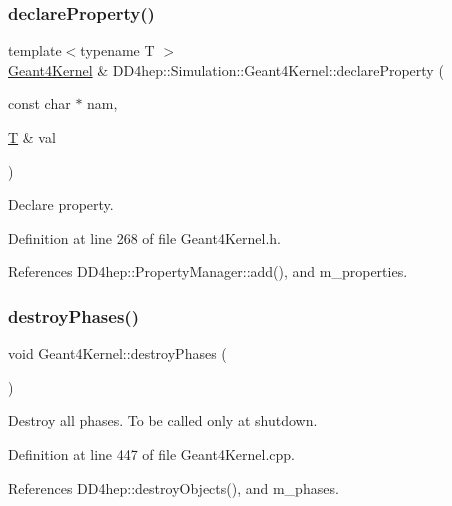 \subsubsection{\texorpdfstring{declare\+Property()}{declareProperty()}\hspace{0.1cm}{\footnotesize\ttfamily [2/2]}}
{\footnotesize\ttfamily template$<$typename T $>$ \\
\hyperlink{class_d_d4hep_1_1_simulation_1_1_geant4_kernel}{Geant4\+Kernel} \& D\+D4hep\+::\+Simulation\+::\+Geant4\+Kernel\+::declare\+Property (\begin{DoxyParamCaption}\item[{const char $\ast$}]{nam,  }\item[{\hyperlink{class_t}{T} \&}]{val }\end{DoxyParamCaption})}



Declare property. 



Definition at line 268 of file Geant4\+Kernel.\+h.



References D\+D4hep\+::\+Property\+Manager\+::add(), and m\+\_\+properties.

\hypertarget{class_d_d4hep_1_1_simulation_1_1_geant4_kernel_af8c01fc03cdb8db95fafe071eee0ba5a}{}\label{class_d_d4hep_1_1_simulation_1_1_geant4_kernel_af8c01fc03cdb8db95fafe071eee0ba5a} 
\subsubsection{\texorpdfstring{destroy\+Phases()}{destroyPhases()}}
{\footnotesize\ttfamily void Geant4\+Kernel\+::destroy\+Phases (\begin{DoxyParamCaption}{ }\end{DoxyParamCaption})\hspace{0.3cm}{\ttfamily [virtual]}}



Destroy all phases. To be called only at shutdown. 



Definition at line 447 of file Geant4\+Kernel.\+cpp.



References D\+D4hep\+::destroy\+Objects(), and m\+\_\+phases.



